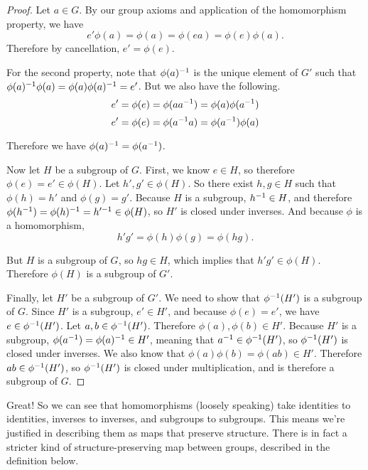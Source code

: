 \begin{proof}
Let $a \in G$. By our group axioms and application of the homomorphism property, we have
\begin{equation*}
    e'\phi(a) = \phi(a) = \phi(ea) = \phi(e)\phi(a).
\end{equation*}
Therefore by cancellation, $e' = \phi(e)$.

For the second property, note that $\phi(a)^{-1}$ is the unique element of $G'$ such that $\phi(a)^{-1}\phi(a) = \phi(a)\phi(a)^{-1} = e'$. But we also have the following.
\begin{equation*}
    e' = \phi(e) = \phi(aa^{-1}) = \phi(a)\phi(a^{-1})
\end{equation*}
\begin{equation*}
    e' = \phi(e) = \phi(a^{-1} a) = \phi(a^{-1})\phi(a)
\end{equation*}

Therefore we have $\phi(a)^{-1} = \phi(a^{-1})$.

Now let $H$ be a subgroup of $G$. First, we know $e \in H$, so therefore $\phi(e) = e' \in \phi(H)$. Let $h', g' \in \phi(H)$. So there exist $h, g \in H$ such that $\phi(h) = h'$ and $\phi(g) = g'$. Because $H$ is a subgroup, $h^{-1} \in H$, and therefore $\phi(h^{-1}) = \phi(h)^{-1} = h'^{-1} \in \phi(H)$, so $H'$ is closed under inverses. And because $\phi$ is a homomorphism,
\begin{equation*}
    h'g' = \phi(h)\phi(g) = \phi(hg).
\end{equation*}

But $H$ is a subgroup of $G$, so $hg \in H$, which implies that $h'g' \in \phi(H)$. Therefore $\phi(H)$ is a subgroup of $G'$.

Finally, let $H'$ be a subgroup of $G'$. We need to show that $\phi^{-1} (H')$ is a subgroup of $G$. Since $H'$ is a subgroup, $e' \in H'$, and because $\phi(e) = e'$, we have $e \in \phi^{-1}(H')$. Let $a, b \in \phi^{-1}(H')$. Therefore $\phi(a), \phi(b) \in H'$. Because $H'$ is a subgroup, $\phi(a^{-1}) = \phi(a)^{-1} \in H'$, meaning that $a^{-1} \in \phi^{-1}(H')$, so $\phi^{-1}(H')$ is closed under inverses. We also know that $\phi(a)\phi(b) = \phi(ab) \in H'$. Therefore $ab \in \phi^{-1}(H')$, so $\phi^{-1}(H')$ is closed under multiplication, and is therefore a subgroup of $G$.

\end{proof}

Great! So we can see that homomorphisms (loosely speaking) take identities to identities, inverses to inverses, and subgroups to subgroups. This means we're justified in describing them as maps that preserve structure. There is in fact a stricter kind of structure-preserving map between groups, described in the definition below.

